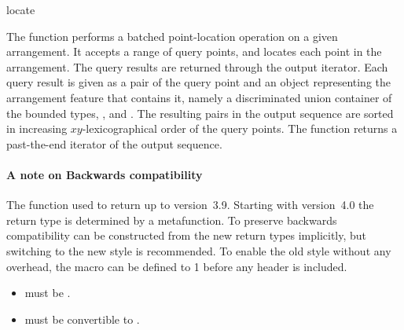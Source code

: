 \ccRefPageBegin

\begin{ccRefFunction}{locate}

\ccDefinition

The function \ccRefName{} performs a batched point-location operation on a
given arrangement. It accepts a range of query points, and locates each
point in the arrangement. The query results are returned through the output
iterator. Each query result is given as a pair of the query point and an
object representing the arrangement feature that contains it, namely a
discriminated union container of the bounded types,
, and . The resulting
pairs in the output sequence are sorted in increasing $xy$-lexicographical
order of the query points. The function returns a past-the-end iterator of
the output sequence.

\paragraph{A note on Backwards compatibility}
The function \ccRefName{} used to return  up to
\cgal{} version~3.9. Starting with \cal{} version~4.0 the return type
is determined by a metafunction. To preserve backwards compatibility
 can be constructed from the new return types
implicitly, but switching to the new style is recommended. To enable
the old style without any overhead, the macro
 can be defined to 1 before any
\cgal{} header is included.



\ccRequirements
\begin{itemize}
\item {} must be .
\item {} must be convertible to
  .
\end{itemize}

\ccSeeAlso
\\

\end{ccRefFunction}

\ccRefPageEnd
